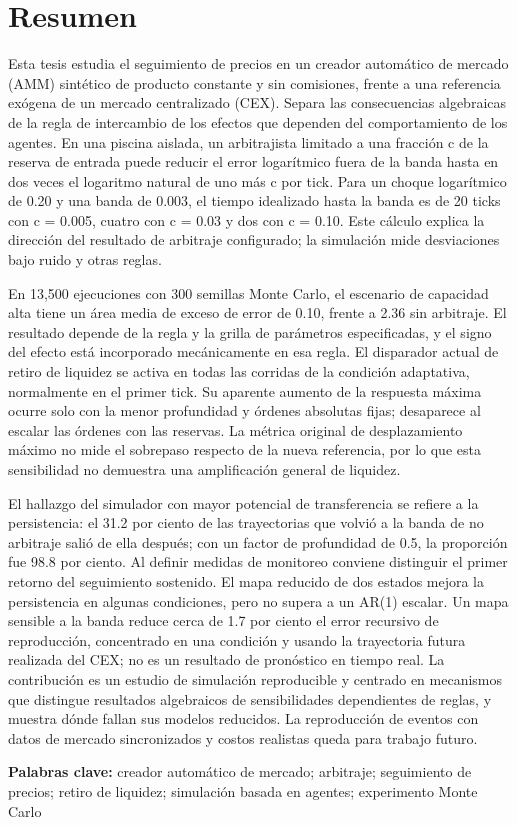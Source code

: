 \section{Resumen}

Esta tesis estudia el seguimiento de precios en un creador automático de mercado (AMM) sintético de producto constante y sin comisiones, frente a una referencia exógena de un mercado centralizado (CEX). Separa las consecuencias algebraicas de la regla de intercambio de los efectos que dependen del comportamiento de los agentes. En una piscina aislada, un arbitrajista limitado a una fracción c de la reserva de entrada puede reducir el error logarítmico fuera de la banda hasta en dos veces el logaritmo natural de uno más c por tick. Para un choque logarítmico de 0.20 y una banda de 0.003, el tiempo idealizado hasta la banda es de 20 ticks con c = 0.005, cuatro con c = 0.03 y dos con c = 0.10. Este cálculo explica la dirección del resultado de arbitraje configurado; la simulación mide desviaciones bajo ruido y otras reglas.

En 13,500 ejecuciones con 300 semillas Monte Carlo, el escenario de capacidad alta tiene un área media de exceso de error de 0.10, frente a 2.36 sin arbitraje. El resultado depende de la regla y la grilla de parámetros especificadas, y el signo del efecto está incorporado mecánicamente en esa regla. El disparador actual de retiro de liquidez se activa en todas las corridas de la condición adaptativa, normalmente en el primer tick. Su aparente aumento de la respuesta máxima ocurre solo con la menor profundidad y órdenes absolutas fijas; desaparece al escalar las órdenes con las reservas. La métrica original de desplazamiento máximo no mide el sobrepaso respecto de la nueva referencia, por lo que esta sensibilidad no demuestra una amplificación general de liquidez.

El hallazgo del simulador con mayor potencial de transferencia se refiere a la persistencia: el 31.2 por ciento de las trayectorias que volvió a la banda de no arbitraje salió de ella después; con un factor de profundidad de 0.5, la proporción fue 98.8 por ciento. Al definir medidas de monitoreo conviene distinguir el primer retorno del seguimiento sostenido. El mapa reducido de dos estados mejora la persistencia en algunas condiciones, pero no supera a un AR(1) escalar. Un mapa sensible a la banda reduce cerca de 1.7 por ciento el error recursivo de reproducción, concentrado en una condición y usando la trayectoria futura realizada del CEX; no es un resultado de pronóstico en tiempo real. La contribución es un estudio de simulación reproducible y centrado en mecanismos que distingue resultados algebraicos de sensibilidades dependientes de reglas, y muestra dónde fallan sus modelos reducidos. La reproducción de eventos con datos de mercado sincronizados y costos realistas queda para trabajo futuro.

\textbf{Palabras clave:} creador automático de mercado; arbitraje; seguimiento de precios; retiro de liquidez; simulación basada en agentes; experimento Monte Carlo
